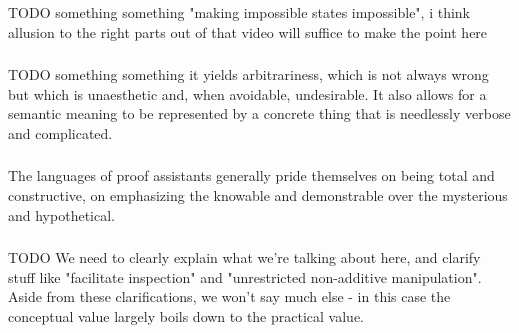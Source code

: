 \subsubsection{\SemTot}
\label{sec:Problem:concept:SemTot}
TODO something something "making impossible states impossible", i think allusion to the right parts out of that
video will suffice to make the point here

\subsubsection{\SemInj}
\label{sec:Problem:concept:SemInj}
TODO something something it yields arbitrariness, which is not always wrong but which is unaesthetic and, when
avoidable, undesirable. It also allows for a semantic meaning to be represented by a concrete thing that is
needlessly verbose and complicated.

\subsubsection{\EqDec}
\label{sec:Problem:concept:EqDec}
The languages of proof assistants generally pride themselves on being total and constructive, on emphasizing
the knowable and demonstrable over the mysterious and hypothetical.

\subsubsection{\EzDstr}
\label{sec:Problem:concept:EzDstr}
TODO We need to clearly explain what we're talking about here, and clarify stuff like "facilitate inspection"
and "unrestricted non-additive manipulation". Aside from these clarifications, we won't say much else - in
this case the conceptual value largely boils down to the practical value.



